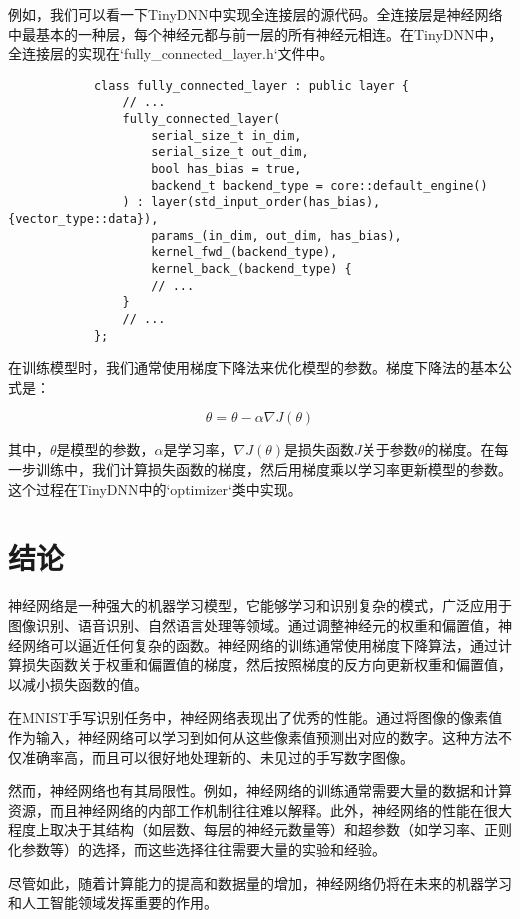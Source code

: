 \documentclass{ctexart}
\begin{document}
            例如，我们可以看一下TinyDNN中实现全连接层的源代码。全连接层是神经网络中最基本的一种层，每个神经元都与前一层的所有神经元相连。在TinyDNN中，全连接层的实现在`fully\_connected\_layer.h`文件中。

            \begin{lstlisting}
            class fully_connected_layer : public layer {
                // ...
                fully_connected_layer(
                    serial_size_t in_dim,
                    serial_size_t out_dim,
                    bool has_bias = true,
                    backend_t backend_type = core::default_engine()
                ) : layer(std_input_order(has_bias), {vector_type::data}),
                    params_(in_dim, out_dim, has_bias),
                    kernel_fwd_(backend_type),
                    kernel_back_(backend_type) {
                    // ...
                }
                // ...
            };
            \end{lstlisting}

            在训练模型时，我们通常使用梯度下降法来优化模型的参数。梯度下降法的基本公式是：

            \[ \theta = \theta - \alpha \nabla J(\theta) \]

            其中，$\theta$是模型的参数，$\alpha$是学习率，$\nabla J(\theta)$是损失函数$J$关于参数$\theta$的梯度。在每一步训练中，我们计算损失函数的梯度，然后用梯度乘以学习率更新模型的参数。这个过程在TinyDNN中的`optimizer`类中实现。

\section{结论}
神经网络是一种强大的机器学习模型，它能够学习和识别复杂的模式，广泛应用于图像识别、语音识别、自然语言处理等领域。通过调整神经元的权重和偏置值，神经网络可以逼近任何复杂的函数。神经网络的训练通常使用梯度下降算法，通过计算损失函数关于权重和偏置值的梯度，然后按照梯度的反方向更新权重和偏置值，以减小损失函数的值。

在MNIST手写识别任务中，神经网络表现出了优秀的性能。通过将图像的像素值作为输入，神经网络可以学习到如何从这些像素值预测出对应的数字。这种方法不仅准确率高，而且可以很好地处理新的、未见过的手写数字图像。

然而，神经网络也有其局限性。例如，神经网络的训练通常需要大量的数据和计算资源，而且神经网络的内部工作机制往往难以解释。此外，神经网络的性能在很大程度上取决于其结构（如层数、每层的神经元数量等）和超参数（如学习率、正则化参数等）的选择，而这些选择往往需要大量的实验和经验。

尽管如此，随着计算能力的提高和数据量的增加，神经网络仍将在未来的机器学习和人工智能领域发挥重要的作用。



\end{document}
